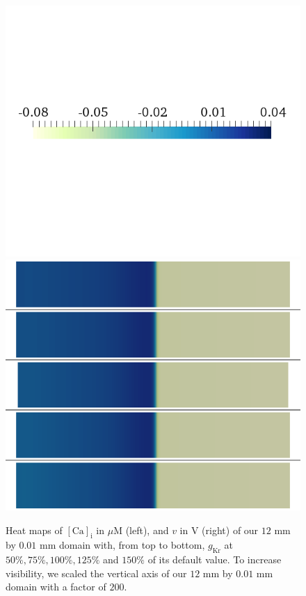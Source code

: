 \documentclass{article}
\begin{document}
\begin{figure}
\begin{minipage}{0.5\textwidth}
\includegraphics[trim=0cm 7cm 0cm 6cm, clip=true, width=1\linewidth]{legend_v2}
\includegraphics[trim=0cm 0cm 0cm 0cm, clip=true, width=1\linewidth]{v_gkr}
    \end{minipage}
    \caption{Heat maps of $[\mathrm{Ca}]_{\mathrm{i}}$ in $\mu$M (left), and $v$ in V (right) of our $12$ mm by $0.01$ mm domain with, from top to bottom, $g_{\mathrm{Kr}}$ at $50\%, 75\%, 100\%, 125\%$ and $150\%$ of its default value. To increase visibility, we scaled the vertical axis of our $12$ mm by $0.01$ mm domain with a factor of $200$.}
    \label{fig:1c}
\end{figure}
\end{document}
